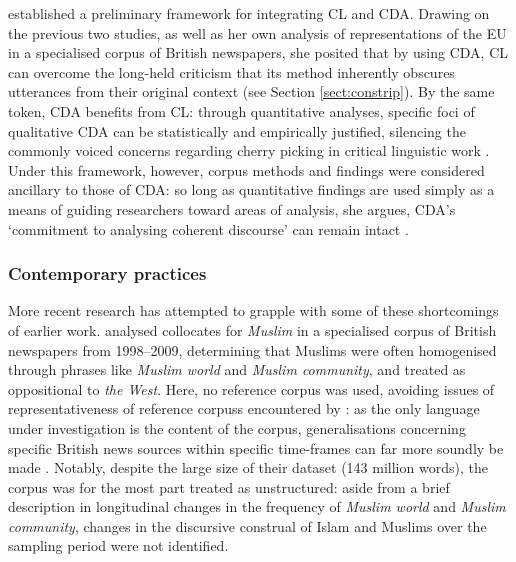 \textcite{hardt-mautner_only_1995} established a preliminary framework for integrating \gls{CL} and \gls{CDA}. Drawing on the previous two studies, as well as her own analysis of representations of the EU in a specialised \gls{corpus} of British newspapers, she posited that by using \gls{CDA}, \gls{CL} can overcome the long\hyp{}held criticism that its method inherently obscures utterances from their original context (see Section \ref{sect:constrip}). By the same token, \gls{CDA} benefits from \gls{CL}: through quantitative analyses, specific foci of qualitative \gls{CDA} can be statistically and empirically justified, silencing the commonly voiced concerns regarding cherry picking in critical linguistic work \cite{baker_acceptable_2012}.  Under this framework, however, \gls{corpus} methods and findings were considered ancillary to those of \gls{CDA}: so long as quantitative findings are used simply as a means of guiding researchers toward areas of analysis, she argues, \gls{CDA}'s `commitment to analysing coherent discourse' can remain intact \parencite*[p.~3]{hardt-mautner_only_1995}.

\subsubsection{Contemporary practices}

More recent research has attempted to grapple with some of these shortcomings of earlier work. \textcite{baker_sketching_2012} analysed collocates for \emph{Muslim} in a specialised \gls{corpus} of British newspapers from 1998--2009, determining that Muslims were often homogenised through phrases like \emph{Muslim world} and \emph{Muslim community}, and treated as oppositional to \emph{the West}. Here, no reference \gls{corpus} was used, avoiding issues of representativeness of reference \glspl{corpus} encountered by \textcite{fox_comparison_1993}: as the only language under investigation is the content of the \gls{corpus}, generalisations concerning specific British news sources within specific time\hyp{}frames can far more soundly be made \cite{hoey_lexical_2005}. Notably, despite the large size of their dataset (143 million words), the corpus was for the most part treated as unstructured: aside from a brief description in longitudinal changes in the frequency of \emph{Muslim world} and \emph{Muslim community}, changes in the discursive construal of Islam and Muslims over the sampling period were not identified.

